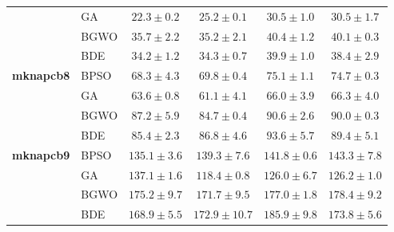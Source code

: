 \begin{table}[htbp]
\begin{tabular*}{\textwidth}{@{\extracolsep{\fill}}llcccc@{}}
                       & GA    &  $\mathbf{22.3 \pm 0.2}$ &           $25.2 \pm 0.1$ &           $30.5 \pm 1.0$ &           $30.5 \pm 1.7$ \\
                       & BGWO  &           $35.7 \pm 2.2$ &  $\mathbf{35.2 \pm 2.1}$ &           $40.4 \pm 1.2$ &           $40.1 \pm 0.3$ \\
                       & BDE   &  $\mathbf{34.2 \pm 1.2}$ &           $34.3 \pm 0.7$ &           $39.9 \pm 1.0$ &           $38.4 \pm 2.9$ \\
    \midrule
    \textbf{mknapcb8}  & BPSO  &  $\mathbf{68.3 \pm 4.3}$ &           $69.8 \pm 0.4$ &           $75.1 \pm 1.1$ &           $74.7 \pm 0.3$ \\
                       & GA    &           $63.6 \pm 0.8$ &  $\mathbf{61.1 \pm 4.1}$ &           $66.0 \pm 3.9$ &           $66.3 \pm 4.0$ \\
                       & BGWO  &           $87.2 \pm 5.9$ &  $\mathbf{84.7 \pm 0.4}$ &           $90.6 \pm 2.6$ &           $90.0 \pm 0.3$ \\
                       & BDE   &  $\mathbf{85.4 \pm 2.3}$ &           $86.8 \pm 4.6$ &           $93.6 \pm 5.7$ &           $89.4 \pm 5.1$ \\
    \midrule
    \textbf{mknapcb9}  & BPSO  & $\mathbf{135.1 \pm 3.6}$ &          $139.3 \pm 7.6$ &          $141.8 \pm 0.6$ &          $143.3 \pm 7.8$ \\
                       & GA    &          $137.1 \pm 1.6$ & $\mathbf{118.4 \pm 0.8}$ &          $126.0 \pm 6.7$ &          $126.2 \pm 1.0$ \\
                       & BGWO  &          $175.2 \pm 9.7$ & $\mathbf{171.7 \pm 9.5}$ &          $177.0 \pm 1.8$ &          $178.4 \pm 9.2$ \\
                       & BDE   & $\mathbf{168.9 \pm 5.5}$ &         $172.9 \pm 10.7$ &          $185.9 \pm 9.8$ &          $173.8 \pm 5.6$ \\
    \bottomrule
  \end{tabular*}
\end{table}
